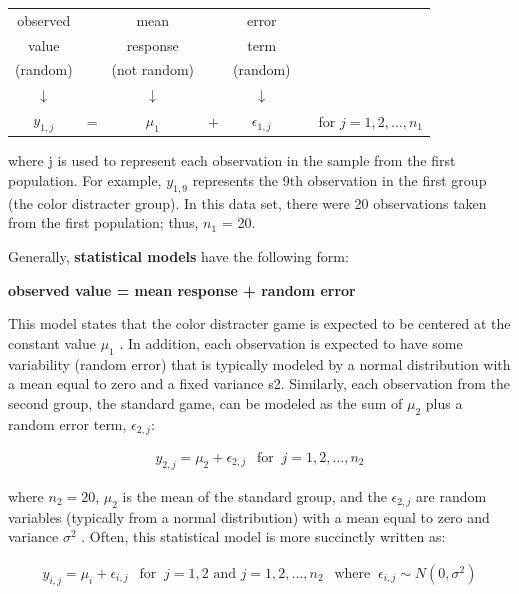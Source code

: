 \documentclass[
]{report}
\begin{document}
\begin{table}[!h]
\centering
\begin{tabular}{ccccccc}
\toprule
observed &  & mean &  & error &  & \\
value &  & response &  & term &  & \\
(random) &  & (not random) &  & (random) &  & \\
$\downarrow$ &  & $\downarrow$ &  & $\downarrow$ &  & \\
$y_{1,j}$ & = & $\mu_1$ & $+$ & $\epsilon_{1,j}$ &  & for $j = 1, 2, \dots, n_1$\\
\bottomrule
\end{tabular}
\end{table}

where j is used to represent each observation in the sample from the first population. For example, \(\scriptstyle y_{1, 9}\) represents the 9th observation in the first group (the color distracter group). In this data set, there were 20 observations taken from the first population; thus, \(\scriptstyle n_1\) = 20.

Generally, \textbf{statistical models} have the following form:

\begin{center}
\textbf{\large observed value = mean response + random error}
\end{center}

This model states that the color distracter game is expected to be centered at the constant value \(\scriptstyle \mu_1\) . In addition, each observation is expected to have some variability (random error) that is typically modeled by a normal distribution with a mean equal to zero and a fixed variance s2. Similarly, each observation from the second group, the standard game, can be modeled as the sum of \(\scriptstyle \mu_2\) plus a random error term, \(\scriptstyle \epsilon_{2, j}\):

\begin{align*}
y_{2, j} = \mu_2 + \epsilon_{2, j}  ~~\text{ for }~ j = 1, 2, ... ,n_2
\end{align*}

where \(\scriptstyle n_2 = 20\), \(\scriptstyle \mu_2\) is the mean of the standard group, and the \(\scriptstyle \epsilon_{2, j}\) are random variables (typically from a normal distribution) with a mean equal to zero and variance \(\scriptstyle \sigma^2\) . Often, this statistical model is more succinctly written as:

\begin{align} \label{2.1}
y_{i, j} = \mu_i + \epsilon_{i, j} ~~\text{ for }~ j = 1, 2 \text{ and } j = 1, 2, ... ,n_2 ~~\text{ where }~  \epsilon_{i, j} \sim N(0,\sigma^2)
\tag{2.1}
\end{align}
\end{document}
